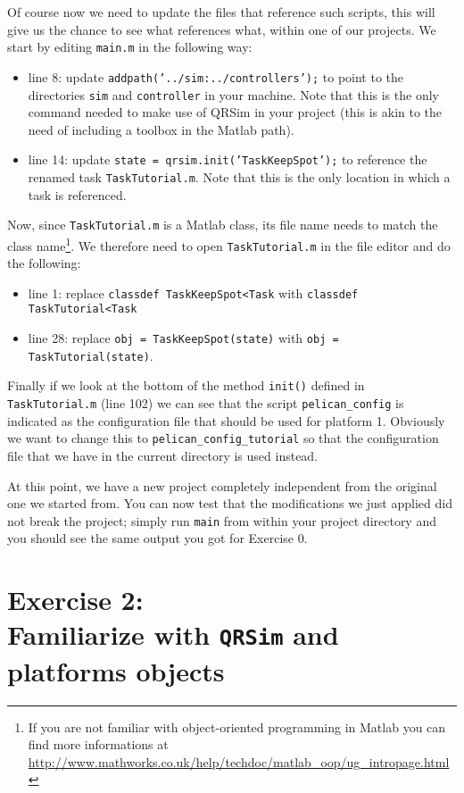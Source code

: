 \documentclass[a4paper,11pt]{article}
\begin{document}
Of course now we need to update the files that reference such scripts, this will give us the chance to see what references what, within one of our projects.
We start by editing \texttt{main.m} in the following way:
\begin{itemize}
 \item line 8: update \texttt{addpath('../sim:../controllers');} to point to the directories \texttt{sim} and \texttt{controller} in your machine. Note that this is the only command needed to make use of QRSim in your project (this is akin to the need of including a toolbox in the Matlab path).
 \item line 14: update \texttt{state = qrsim.init('TaskKeepSpot');} to reference the renamed task \texttt{TaskTutorial.m}. Note that this is the only location in which a task is referenced.
\end{itemize}  
Now, since \texttt{TaskTutorial.m} is a Matlab class, its file name needs to match the class name\footnote{If you are not familiar with object-oriented programming in Matlab you can find more informations at \url{http://www.mathworks.co.uk/help/techdoc/matlab_oop/ug_intropage.html}}. We therefore need to open \texttt{TaskTutorial.m} in the file editor and do the following:
\begin{itemize}
 \item line 1: replace \texttt{classdef TaskKeepSpot<Task} with \texttt{classdef TaskTutorial<Task}
 \item line 28: replace \texttt{obj = TaskKeepSpot(state)} with \texttt{obj = TaskTutorial(state)}.
\end{itemize}
Finally if we look at the bottom of the method \texttt{init()} defined in \texttt{TaskTutorial.m} (line 102) we can see that the script \texttt{pelican\_config} is indicated as the configuration file that should be used for platform 1. Obviously we want to change this to \texttt{pelican\_config\_tutorial} so that the configuration file that we have in the current directory is used instead.

At this point, we have a new project completely independent from the original one we started from. You can now test that the modifications we just applied did not break the project; simply run \texttt{main} from within your project directory and you should see the same output you got for Exercise 0. 


\section*{Exercise 2:\\Familiarize with \texttt{QRSim} and platforms objects}
\end{document}

